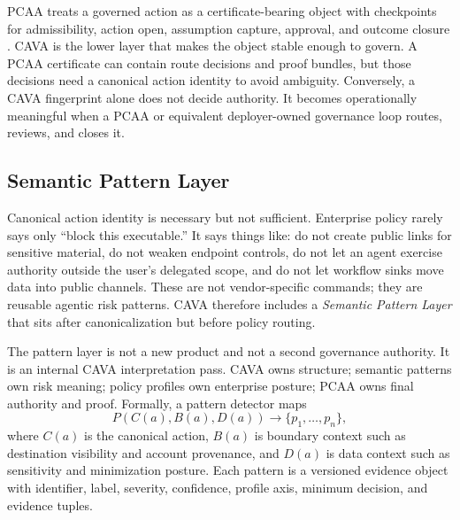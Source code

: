 \documentclass[11pt]{article}
\begin{document}
PCAA treats a governed action as a certificate-bearing object with checkpoints for admissibility, action open, assumption capture, approval, and outcome closure \citep{pcaa2026}. CAVA is the lower layer that makes the object stable enough to govern. A PCAA certificate can contain route decisions and proof bundles, but those decisions need a canonical action identity to avoid ambiguity. Conversely, a CAVA fingerprint alone does not decide authority. It becomes operationally meaningful when a PCAA or equivalent deployer-owned governance loop routes, reviews, and closes it.

\subsection{Semantic Pattern Layer}

Canonical action identity is necessary but not sufficient. Enterprise policy rarely says only ``block this executable.'' It says things like: do not create public links for sensitive material, do not weaken endpoint controls, do not let an agent exercise authority outside the user's delegated scope, and do not let workflow sinks move data into public channels. These are not vendor-specific commands; they are reusable agentic risk patterns. CAVA therefore includes a \emph{Semantic Pattern Layer} that sits after canonicalization but before policy routing.

The pattern layer is not a new product and not a second governance authority. It is an internal CAVA interpretation pass. CAVA owns structure; semantic patterns own risk meaning; policy profiles own enterprise posture; PCAA owns final authority and proof. Formally, a pattern detector maps
\[
  P(C(a), B(a), D(a)) \rightarrow \{p_1,\ldots,p_n\},
\]
where $C(a)$ is the canonical action, $B(a)$ is boundary context such as destination visibility and account provenance, and $D(a)$ is data context such as sensitivity and minimization posture. Each pattern is a versioned evidence object with identifier, label, severity, confidence, profile axis, minimum decision, and evidence tuples.
\end{document}
